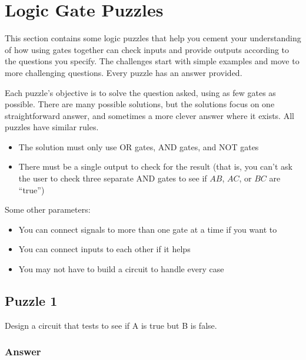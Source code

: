 %

\section{Logic Gate Puzzles}

This section contains some logic puzzles that help you cement your understanding of how using gates together can check inputs and provide outputs according to the questions you specify. The challenges start with simple examples and move to more challenging questions. Every puzzle has an answer provided.


Each puzzle's objective is to solve the question asked, using as few gates as possible. There are many possible solutions, but the solutions focus on one straightforward answer, and sometimes a more clever answer where it exists. All puzzles have similar rules.

\begin{itemize}
\item The solution must only use OR gates, AND gates, and NOT gates
\item There must be a single output to check for the result (that is, you can't ask the user to check three separate AND gates to see if $AB$, $AC$, or $BC$ are ``true'')
\end{itemize}

Some other parameters:
\begin{itemize}
\item You can connect signals to more than one gate at a time if you want to
\item You can connect inputs to each other if it helps
\item You may not have to build a circuit to handle every case
\end{itemize}

\clearpage

\subsection*{Puzzle 1}

Design a circuit that tests to see if A is true but B is false.


\vfill 

\subsubsection*{Answer}

